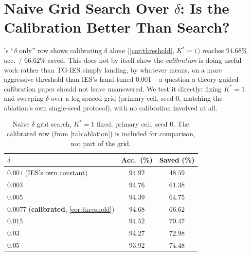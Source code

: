 \documentclass{article}
\theoremstyle{plain}
\theoremstyle{definition}
\theoremstyle{remark}
\begin{document}
\section{Naive Grid Search Over $\delta$: Is the Calibration Better Than Search?}
\label{app:deltagrid}

's ``$\delta$ only'' row shows calibrating $\delta$ alone (\cref{cor:threshold}, $K^*{=}1$) reaches $94.68\%$ acc.\ / $66.62\%$ saved. This does not by itself show the \emph{calibration} is doing useful work rather than TG-IES simply landing, by whatever means, on a more aggressive threshold than IES's hand-tuned $0.001$ -- a question a theory-guided calibration paper should not leave unanswered. We test it directly: fixing $K^*{=}1$ and sweeping $\delta$ over a log-spaced grid (primary cell, seed 0, matching the ablation's own single-seed protocol), with no calibration involved at all.

\begin{table}[h]
\caption{Naive $\delta$ grid search, $K^*{=}1$ fixed, primary cell, seed 0. The calibrated row (from \cref{tab:ablation}) is included for comparison, not part of the grid.}
\label{tab:deltagrid}
\centering
\small
\begin{tabular}{lcc}
\toprule
$\delta$ & Acc.\ (\%) & Saved (\%) \\
\midrule
$0.001$ (IES's own constant) & $94.92$ & $48.59$ \\
$0.003$ & $94.76$ & $61.38$ \\
$0.005$ & $94.39$ & $64.75$ \\
$0.0077$ (\textbf{calibrated}, \cref{cor:threshold}) & $\mathbf{94.68}$ & $\mathbf{66.62}$ \\
$0.015$ & $94.52$ & $70.47$ \\
$0.03$ & $94.27$ & $72.98$ \\
$0.05$ & $93.92$ & $74.48$ \\
\bottomrule
\end{tabular}
\end{table}
\end{document}
